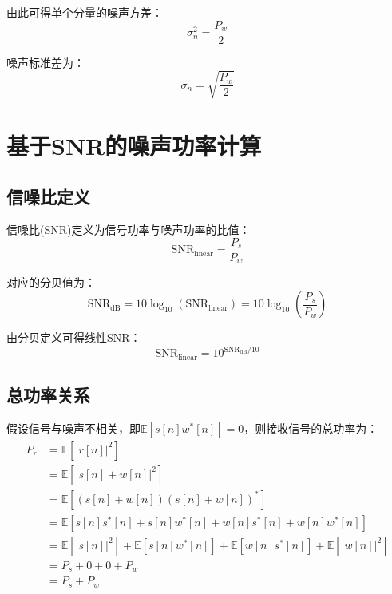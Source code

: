 \documentclass[12pt]{article}
\begin{document}
由此可得单个分量的噪声方差：
\begin{equation}
\sigma_n^2 = \frac{P_w}{2}
\end{equation}

噪声标准差为：
\begin{equation}
\sigma_n = \sqrt{\frac{P_w}{2}}
\end{equation}

\section{基于SNR的噪声功率计算}

\subsection{信噪比定义}

信噪比(SNR)定义为信号功率与噪声功率的比值：
\begin{equation}
\text{SNR}_{\text{linear}} = \frac{P_s}{P_w}
\end{equation}

对应的分贝值为：
\begin{equation}
\text{SNR}_{\text{dB}} = 10\log_{10}(\text{SNR}_{\text{linear}}) = 10\log_{10}\left(\frac{P_s}{P_w}\right)
\end{equation}

由分贝定义可得线性SNR：
\begin{equation}
\text{SNR}_{\text{linear}} = 10^{\text{SNR}_{\text{dB}}/10}
\end{equation}

\subsection{总功率关系}

假设信号与噪声不相关，即$\mathbb{E}[s[n]w^*[n]] = 0$，则接收信号的总功率为：
\begin{align}
P_r &= \mathbb{E}[|r[n]|^2] \\
&= \mathbb{E}[|s[n] + w[n]|^2] \\
&= \mathbb{E}[(s[n] + w[n])(s[n] + w[n])^*] \\
&= \mathbb{E}[s[n]s^*[n] + s[n]w^*[n] + w[n]s^*[n] + w[n]w^*[n]] \\
&= \mathbb{E}[|s[n]|^2] + \mathbb{E}[s[n]w^*[n]] + \mathbb{E}[w[n]s^*[n]] + \mathbb{E}[|w[n]|^2] \\
&= P_s + 0 + 0 + P_w \\
&= P_s + P_w
\end{align}
\end{document}
